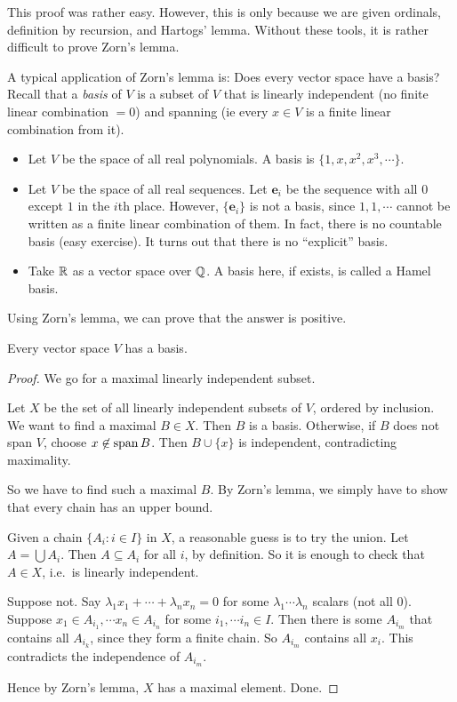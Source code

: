 \documentclass[a4paper]{article}
\begin{document}
This proof was rather easy. However, this is only because we are given ordinals, definition by recursion, and Hartogs' lemma. Without these tools, it is rather difficult to prove Zorn's lemma.

A typical application of Zorn's lemma is: Does every vector space have a basis? Recall that a \emph{basis} of $V$ is a subset of $V$ that is linearly independent (no finite linear combination $= 0$) and spanning (ie every $x\in V$ is a finite linear combination from it).

\begin{eg}\leavevmode
  \begin{itemize}
    \item Let $V$ be the space of all real polynomials. A basis is $\{1, x, x^2, x^3, \cdots\}$.
    \item Let $V$ be the space of all real sequences. Let $\mathbf{e}_i$ be the sequence with all $0$ except $1$ in the $i$th place. However, $\{\mathbf{e}_i\}$ is not a basis, since $1, 1, \cdots$ cannot be written as a finite linear combination of them. In fact, there is no countable basis (easy exercise). It turns out that there is no ``explicit'' basis.
    \item Take $\mathbb{R}$ as a vector space over $\mathbb{Q}$. A basis here, if exists, is called a Hamel basis.
  \end{itemize}
\end{eg}

Using Zorn's lemma, we can prove that the answer is positive.
\begin{thm}
  Every vector space $V$ has a basis.
\end{thm}

\begin{proof}
  We go for a maximal linearly independent subset.

  Let $X$ be the set of all linearly independent subsets of $V$, ordered by inclusion. We want to find a maximal $B\in X$. Then $B$ is a basis. Otherwise, if $B$ does not span $V$, choose $x\not\in \operatorname{span} B$. Then $B\cup \{x\}$ is independent, contradicting maximality.

  So we have to find such a maximal $B$. By Zorn's lemma, we simply have to show that every chain has an upper bound.

  Given a chain $\{A_i: i\in I\}$ in $X$, a reasonable guess is to try the union. Let $A = \bigcup A_i$. Then $A\subseteq A_i$ for all $i$, by definition. So it is enough to check that $A\in X$, i.e.\ is linearly independent.

  Suppose not. Say $\lambda_1x_1 + \cdots + \lambda_nx_n = 0$ for some $\lambda_1 \cdots \lambda_n$ scalars (not all $0$). Suppose $x_1 \in A_{i_1}, \cdots x_n \in A_{i_n}$ for some $i_1, \cdots i_n \in I$. Then there is some $A_{i_m}$ that contains all $A_{i_k}$, since they form a finite chain. So $A_{i_m}$ contains all $x_i$. This contradicts the independence of $A_{i_m}$.

  Hence by Zorn's lemma, $X$ has a maximal element. Done.
\end{proof}
\end{document}
